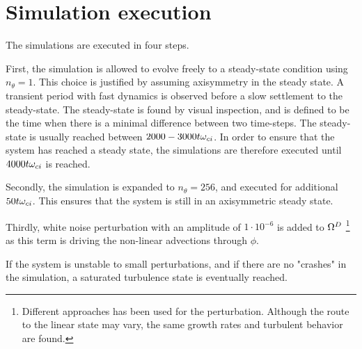\section{Simulation execution}
\label{sec:execution}
%
The simulations are executed in four steps.

First, the simulation is allowed to evolve freely to a steady-state condition using $n_\theta = 1$.
This choice is justified by assuming axisymmetry in the steady state.
A transient period with fast dynamics is observed before a slow settlement to the steady-state.
The steady-state is found by visual inspection, and is defined to be the time when there is a minimal difference between two time-steps.
The steady-state is usually reached between $2000-3000 t\omega_{ci}$.
In order to ensure that the system has reached a steady state, the simulations are therefore executed until $4000 t\omega_{ci}$ is reached.

Secondly, the simulation is expanded to $n_\theta = 256$, and executed for additional $50 t\omega_{ci}$.
This ensures that the system is still in an axisymmetric steady state.

Thirdly, white noise perturbation with an amplitude of $1\cdot10^{-6}$ is added to $\Omega^D$%
\footnote{Different approaches has been used for the perturbation.
    Although the route to the linear state may vary, the same growth rates and turbulent behavior are found.}
%
as this term is driving the non-linear advections through $\phi$.

If the system is unstable to small perturbations, and if there are no "crashes" in the simulation, a saturated turbulence state is eventually reached.

